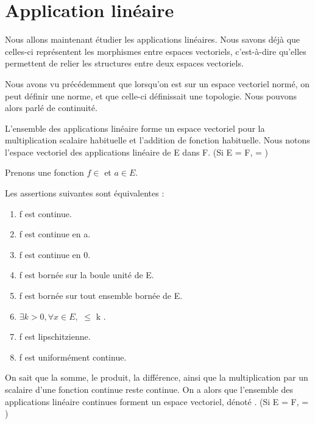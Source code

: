 \section{Application linéaire}
Nous allons maintenant étudier les applications linéaires. Nous savons déjà que
celles-ci représentent les morphismes entre espaces vectoriels, c'est-à-dire
qu'elles permettent de relier les structures entre deux espaces vectoriels.

Nous avons vu précédemment que lorsqu'on est sur un espace vectoriel normé, on
peut définir une norme, et que celle-ci définissait une topologie. Nous pouvons
alors parlé de continuité.

\begin{definition}
	L'ensemble des applications linéaire forme un espace vectoriel pour la
	multiplication scalaire habituelle et l'addition de fonction habituelle.
	Nous notons  l'espace vectoriel des applications
	linéaire de E dans F. (Si E = F,  =
	)
\end{definition}

Prenons une fonction $f \in$  et $a \in E$.

\begin{proposition}
	Les assertions suivantes sont équivalentes :

	\begin{enumerate}
		\item f est continue.
		\item f est continue en a.
		\item f est continue en 0.
		\item f est bornée sur la boule unité de E.
		\item f est bornée sur tout ensemble bornée de E.
		\item $\exists k > 0, \forall x \in E,$  $\leq$ k
			.
		\item f est lipschitzienne.
		\item f est uniformément continue.
	\end{enumerate}
\end{proposition}

On sait que la somme, le produit, la différence, ainsi que la multiplication par
un scalaire d'une fonction continue reste continue. On a alors que l'ensemble
des applications linéaire continues forment un espace vectoriel, dénoté
. (Si E = F,  =
)

